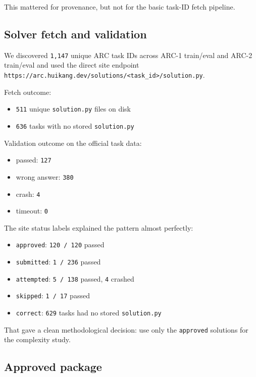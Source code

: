 \documentclass[11pt]{article}
\begin{document}
This mattered for provenance, but not for the basic task-ID fetch pipeline.

\subsection*{Solver fetch and validation}

We discovered \texttt{1,147} unique ARC task IDs across ARC-1 train/eval and ARC-2 train/eval and used the direct site endpoint \texttt{https://arc.huikang.dev/solutions/<task\_id>/solution.py}.

Fetch outcome:

\begin{itemize}
  \item \texttt{511} unique \texttt{solution.py} files on disk
  \item \texttt{636} tasks with no stored \texttt{solution.py}
\end{itemize}

Validation outcome on the official task data:

\begin{itemize}
  \item passed: \texttt{127}
  \item wrong answer: \texttt{380}
  \item crash: \texttt{4}
  \item timeout: \texttt{0}
\end{itemize}

The site status labels explained the pattern almost perfectly:

\begin{itemize}
  \item \texttt{approved}: \texttt{120 / 120} passed
  \item \texttt{submitted}: \texttt{1 / 236} passed
  \item \texttt{attempted}: \texttt{5 / 138} passed, \texttt{4} crashed
  \item \texttt{skipped}: \texttt{1 / 17} passed
  \item \texttt{correct}: \texttt{629} tasks had no stored \texttt{solution.py}
\end{itemize}

That gave a clean methodological decision: use only the \texttt{approved} solutions for the complexity study.

\subsection*{Approved package}
\end{document}
